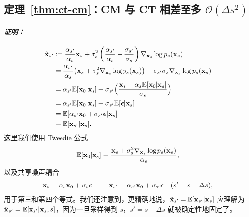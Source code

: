 

\subsection{定理~\ref{thm:ct-cm}：CM 与 CT 相差至多 $\mathcal{O}(\Delta s^2)$}

\paragraph{\textit{证明：}} 

\begin{align*}
\hat{{\mathbf{x}}}_{s'}
&:= \frac{\alpha_{s'}}{\alpha_s} {\mathbf{x}}_s 
+ \sigma_s^2 \left(\frac{\alpha_{s'}}{\alpha_s}-\frac{\sigma_{s'}}{\sigma_s}\right)\nabla_{{\mathbf{x}}_s}\log p_s({\mathbf{x}}_s)
\\
&= \frac{\alpha_{s'}}{\alpha_s}\bigl({\mathbf{x}}_s+\sigma_s^2\nabla_{{\mathbf{x}}_s}\log p_s({\mathbf{x}}_s)\bigr)
- \sigma_{s'}\sigma_s \nabla_{{\mathbf{x}}_s}\log p_s({\mathbf{x}}_s)
\\
&= \alpha_{s'} \mathbb{E}[{\mathbf{x}}_0|{\mathbf{x}}_s]
+ \sigma_{s'}\Bigl(\frac{{\mathbf{x}}_s-\alpha_s \mathbb{E}[{\mathbf{x}}_0|{\mathbf{x}}_s]}{\sigma_s}\Bigr)
\\
&= \alpha_{s'} \mathbb{E}[{\mathbf{x}}_0|{\mathbf{x}}_s] + \sigma_{s'} \mathbb{E}[{\bm{\epsilon}}|{\mathbf{x}}_s]
\\
&= \mathbb{E}[\alpha_{s'}{\mathbf{x}}_0+\sigma_{s'}{\bm{\epsilon}}|{\mathbf{x}}_s]
\\
&= \mathbb{E}[{\mathbf{x}}_{s'}|{\mathbf{x}}_s].
\end{align*}
这里我们使用 Tweedie 公式
\[
\mathbb{E}[{\mathbf{x}}_0 |{\mathbf{x}}_s]=\frac{{\mathbf{x}}_s+\sigma_s^2\nabla_{{\mathbf{x}}_s}\log p_s({\mathbf{x}}_s)}{\alpha_s},
\]
以及共享噪声耦合
\[
{\mathbf{x}}_s=\alpha_s{\mathbf{x}}_0+\sigma_s{\bm{\epsilon}},
\qquad
{\mathbf{x}}_{s'}=\alpha_{s'}{\mathbf{x}}_0+\sigma_{s'}{\bm{\epsilon}}
\quad (s'=s-\Delta s),
\]
用于第三和第四个等式。我们还注意到，更精确地说，$\hat{{\mathbf{x}}}_{s'}=\mathbb{E}[{\mathbf{x}}_{s'}|{\mathbf{x}}_s]$ 应理解为
$\hat{{\mathbf{x}}}_{s'}=\mathbb{E}[{\mathbf{x}}_{s'}|{\mathbf{x}}_s, s]$，因为一旦采样得到 $s$，$s'=s-\Delta s$ 就被确定性地固定了。





